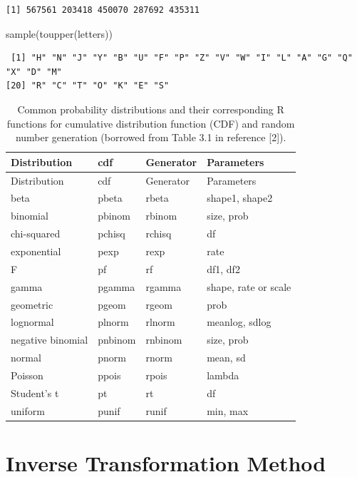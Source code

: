 \documentclass[
  letterpaper,
  DIV=11,
  numbers=noendperiod]{scrreprt}
\newenvironment{Shaded}{\begin{snugshade}}{\end{snugshade}}
\newcommand{\FunctionTok}[1]{\textcolor[rgb]{0.28,0.35,0.67}{#1}}
\newcommand{\NormalTok}[1]{\textcolor[rgb]{0.00,0.23,0.31}{#1}}
\begin{document}
\begin{verbatim}
[1] 567561 203418 450070 287692 435311
\end{verbatim}

\begin{Shaded}
\begin{Highlighting}[]
\FunctionTok{sample}\NormalTok{(}\FunctionTok{toupper}\NormalTok{(letters))}
\end{Highlighting}
\end{Shaded}

\begin{verbatim}
 [1] "H" "N" "J" "Y" "B" "U" "F" "P" "Z" "V" "W" "I" "L" "A" "G" "Q" "X" "D" "M"
[20] "R" "C" "T" "O" "K" "E" "S"
\end{verbatim}

\begin{longtable}[]{@{}llll@{}}
\caption{Common probability distributions and their corresponding R
functions for cumulative distribution function (CDF) and random number
generation (borrowed from Table 3.1 in reference
{[}2{]}).}\label{tbl-my-table}\tabularnewline
\toprule\noalign{}
Distribution & cdf & Generator & Parameters \\
\midrule\noalign{}
\endfirsthead
\toprule\noalign{}
Distribution & cdf & Generator & Parameters \\
\midrule\noalign{}
\endhead
\bottomrule\noalign{}
\endlastfoot
beta & pbeta & rbeta & shape1, shape2 \\
binomial & pbinom & rbinom & size, prob \\
chi-squared & pchisq & rchisq & df \\
exponential & pexp & rexp & rate \\
F & pf & rf & df1, df2 \\
gamma & pgamma & rgamma & shape, rate or scale \\
geometric & pgeom & rgeom & prob \\
lognormal & plnorm & rlnorm & meanlog, sdlog \\
negative binomial & pnbinom & rnbinom & size, prob \\
normal & pnorm & rnorm & mean, sd \\
Poisson & ppois & rpois & lambda \\
Student's t & pt & rt & df \\
uniform & punif & runif & min, max \\
\end{longtable}

\section{Inverse Transformation
Method}\label{inverse-transformation-method}
\end{document}
